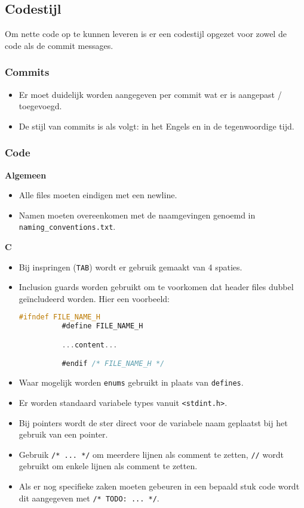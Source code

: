 \subsection{Codestijl}
Om nette code op te kunnen leveren is er een codestijl opgezet voor zowel 
de code als de commit messages.

\subsubsection{Commits}
\begin{itemize}
    \item Er moet duidelijk worden aangegeven per commit wat er is aangepast / 
          toegevoegd.
    \item De stijl van commits is als volgt: in het Engels en in de tegenwoordige
          tijd.
\end{itemize}

\subsubsection{Code}
\textbf{Algemeen}

\begin{itemize}
  \item Alle files moeten eindigen met een newline.
  \item Namen moeten overeenkomen met de naamgevingen genoemd in 
      \texttt{naming\_conventions.txt}.
\end{itemize}

\textbf{C}
\begin{itemize}
  \item Bij inspringen (\texttt{TAB}) wordt er gebruik gemaakt van 4 spaties.
  \item Inclusion guards worden gebruikt om te voorkomen dat header files dubbel
        geïncludeerd worden. Hier een voorbeeld:
        \begin{lstlisting}[language=C,frame=single]
          #ifndef FILE_NAME_H
          #define FILE_NAME_H

          ...content...

          #endif /* FILE_NAME_H */
        \end{lstlisting}
  \item Waar mogelijk worden \texttt{enums} gebruikt in plaats van \texttt{defines}.
  \item Er worden standaard variabele types vanuit \texttt{<stdint.h>}.
  \item Bij pointers wordt de ster direct voor de variabele naam geplaatst
        bij het gebruik van een pointer.
  \item Gebruik \texttt{/* ... */} om meerdere lijnen als comment te zetten,
        \texttt{//} wordt gebruikt om enkele lijnen als comment te zetten.
  \item Als er nog specifieke zaken moeten gebeuren in een bepaald stuk code wordt
        dit aangegeven met \texttt{/* TODO: ... */}.
\end{itemize}
